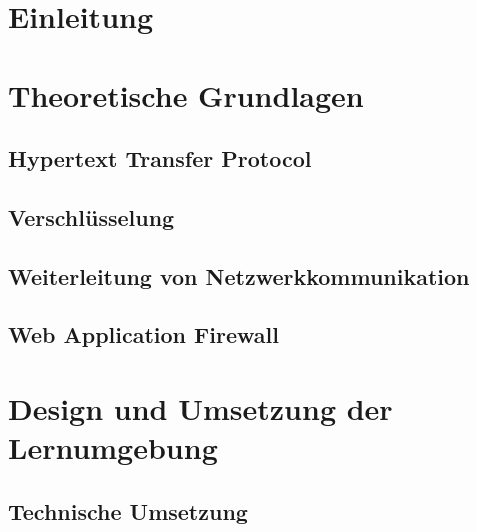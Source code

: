\documentclass[a4paper, 12pt]{article}
\begin{document}
    
    
    
    

    \section{Einleitung}
    

    \section{Theoretische Grundlagen}
    \label{sec:theoretical-foundations}
    \subsection{Hypertext Transfer Protocol}
    
    \subsection{Verschlüsselung}
    
    \subsection{Weiterleitung von Netzwerkkommunikation}
    
    \subsection{Web Application Firewall}
    
    \pagebreak

    \section{Design und Umsetzung der Lernumgebung}
    
    \subsection{Technische Umsetzung}
    
\end{document}

